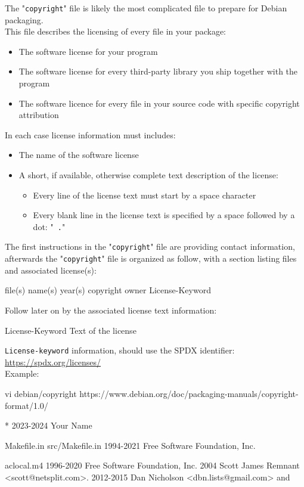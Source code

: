 The "\texttt{copyright}" file is likely the most complicated file to prepare for Debian packaging. \\
This file describes the licensing of every file in your package: 
\begin{itemize}
\item The software license for your program
\item The software license for every third-party library you ship together with the program
\item The software licence for every file in your source code with specific copyright attribution 
\end{itemize}
In each case license information must includes:
\begin{itemize}
\item The name of the software license
\item A short, if available, otherwise complete text description of the license:
\begin{itemize}
\item Every line of the license text must start by a space character
\item Every blank line in the license text is specified by a space followed by a dot: "\texttt{ .}"
\end{itemize}
\end{itemize}
The first instructions in the "\texttt{copyright}" file are providing contact information, afterwards the "\texttt{copyright}" file is organized as follow, 
with a section listing files and associated license(s):
\begin{script}
     file(s) name(s) 
 year(s) copyright owner
   License-Keyword
\end{script}
Follow later on by the associated license text information:
\begin{script}
 License-Keyword
 Text of the license
\end{script}
\noindent \texttt{License-keyword} information, should use the SPDX identifier: \href{https://spdx.org/licenses/}{https://spdx.org/licenses/} \\[0.5cm]
\noindent Example: 
\vspace{-0.25cm}
{\footnotesize{
\begin{script}
 vi debian/copyright
 https://www.debian.org/doc/packaging-manuals/copyright-format/1.0/
 
 \var{\email}
 \var{\gitprog/}

      *
 2023-2024 Your Name
   

      Makefile.in
             src/Makefile.in
 1994-2021 Free Software Foundation, Inc.
   

      aclocal.m4
 1996-2020 Free Software Foundation, Inc.
             2004 Scott James Remnant <scott@netsplit.com>.
             2012-2015 Dan Nicholson <dbn.lists@gmail.com>
    and 
\end{script}
}}
